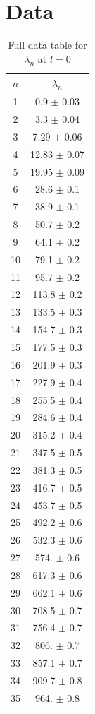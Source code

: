 \documentclass[12pt,twoside]{reedthesis}
\begin{document}
\chapter{Data}
\begin{table}[h]
\centering
	\caption{Full data table for $\lambda_n$ at $l = 0$}
	\label{tab:l0}
	\begin{tabular}{c|c}
		$n$	& $\lambda_n$\\
		\hline
		1	& 0.9 $\pm$ 0.03\\
		2	& 3.3 $\pm$ 0.04\\
		3	& 7.29 $\pm$ 0.06\\
		4	& 12.83 $\pm$ 0.07\\
		5	& 19.95 $\pm$ 0.09\\
		6	& 28.6 $\pm$ 0.1\\
		7	& 38.9 $\pm$ 0.1\\
		8	& 50.7 $\pm$ 0.2\\
		9	& 64.1 $\pm$ 0.2\\
		10	& 79.1 $\pm$ 0.2\\
		11	& 95.7 $\pm$ 0.2\\
		12	& 113.8 $\pm$ 0.2\\
		13	& 133.5 $\pm$ 0.3\\
		14	& 154.7 $\pm$ 0.3\\
		15	& 177.5 $\pm$ 0.3\\
		16	& 201.9 $\pm$ 0.3\\
		17	& 227.9 $\pm$ 0.4\\
		18	& 255.5 $\pm$ 0.4\\
		19	& 284.6 $\pm$ 0.4\\
		20	& 315.2 $\pm$ 0.4\\
		21	& 347.5 $\pm$ 0.5\\
		22	& 381.3 $\pm$ 0.5\\
		23	& 416.7 $\pm$ 0.5\\
		24	& 453.7 $\pm$ 0.5\\
		25	& 492.2 $\pm$ 0.6\\
		26	& 532.3 $\pm$ 0.6\\
		27	& 574. $\pm$ 0.6\\
		28	& 617.3 $\pm$ 0.6\\
		29	& 662.1 $\pm$ 0.6\\
		30	& 708.5 $\pm$ 0.7\\
		31	& 756.4 $\pm$ 0.7\\
		32	& 806. $\pm$ 0.7\\
		33	& 857.1 $\pm$ 0.7\\
		34	& 909.7 $\pm$ 0.8\\
		35	& 964. $\pm$ 0.8
	\end{tabular}
\end{table}
\end{document}
